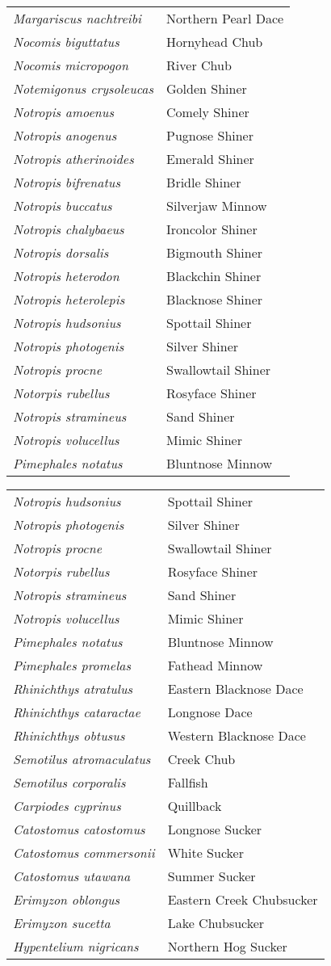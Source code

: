 \documentclass[11pt]{article}
\begin{document}
\vspace{\baselineskip}

%
\textbf{\Student}

\begin{tabular}{@{}L{3in}L{3in}@{}}
\textit{Margariscus nachtreibi} & Northern Pearl Dace\tabularnewline
\textit{Nocomis biguttatus} & Hornyhead Chub\tabularnewline
\textit{Nocomis micropogon} & River Chub\tabularnewline
\textit{Notemigonus crysoleucas} & Golden Shiner\tabularnewline
\textit{Notropis amoenus} & Comely Shiner\tabularnewline
\textit{Notropis anogenus} & Pugnose Shiner\tabularnewline
\textit{Notropis atherinoides} & Emerald Shiner\tabularnewline
\textit{Notropis bifrenatus} & Bridle Shiner\tabularnewline
\textit{Notropis buccatus} & Silverjaw Minnow\tabularnewline
\textit{Notropis chalybaeus} & Ironcolor Shiner\tabularnewline
\textit{Notropis dorsalis} & Bigmouth Shiner\tabularnewline
\textit{Notropis heterodon} & Blackchin Shiner\tabularnewline
\textit{Notropis heterolepis} & Blacknose Shiner\tabularnewline
\textit{Notropis hudsonius} & Spottail Shiner\tabularnewline
\textit{Notropis photogenis} & Silver Shiner\tabularnewline
\textit{Notropis procne} & Swallowtail Shiner\tabularnewline
\textit{Notorpis rubellus} & Rosyface Shiner\tabularnewline
\textit{Notropis stramineus} & Sand Shiner\tabularnewline
\textit{Notropis volucellus} & Mimic Shiner\tabularnewline
\textit{Pimephales notatus} & Bluntnose Minnow\tabularnewline
\end{tabular}

\newpage

\vspace{\baselineskip}

%
\textbf{\Student}

\begin{tabular}{@{}L{3in}L{3in}@{}}
\textit{Notropis hudsonius} & Spottail Shiner\tabularnewline
\textit{Notropis photogenis} & Silver Shiner\tabularnewline
\textit{Notropis procne} & Swallowtail Shiner\tabularnewline
\textit{Notorpis rubellus} & Rosyface Shiner\tabularnewline
\textit{Notropis stramineus} & Sand Shiner\tabularnewline
\textit{Notropis volucellus} & Mimic Shiner\tabularnewline
\textit{Pimephales notatus} & Bluntnose Minnow\tabularnewline
\textit{Pimephales promelas} & Fathead Minnow\tabularnewline
\textit{Rhinichthys atratulus} & Eastern Blacknose Dace\tabularnewline
\textit{Rhinichthys cataractae} & Longnose Dace\tabularnewline
\textit{Rhinichthys obtusus} & Western Blacknose Dace\tabularnewline
\textit{Semotilus atromaculatus} & Creek Chub\tabularnewline
\textit{Semotilus corporalis} & Fallfish\tabularnewline
\textit{Carpiodes cyprinus} & Quillback\tabularnewline
\textit{Catostomus catostomus} & Longnose Sucker\tabularnewline
\textit{Catostomus commersonii} & White Sucker\tabularnewline
\textit{Catostomus utawana} & Summer Sucker\tabularnewline
\textit{Erimyzon oblongus} & Eastern Creek Chubsucker\tabularnewline
\textit{Erimyzon sucetta} & Lake Chubsucker\tabularnewline
\textit{Hypentelium nigricans} & Northern Hog Sucker\tabularnewline
\end{tabular}
\end{document}
